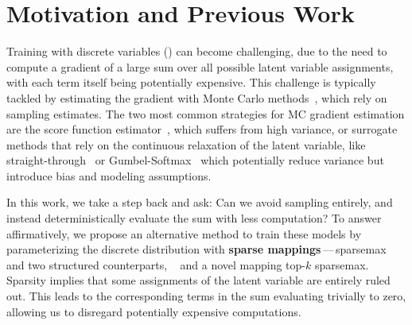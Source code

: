 \label{cap:sparsemarg}

\section{Motivation and Previous Work}
\label{sec:intro}

Training with discrete variables () can
become challenging, due to the need to compute a gradient of a large
sum over all possible latent variable assignments, with each term
itself being potentially expensive. This challenge is typically
tackled by estimating the gradient with Monte Carlo
methods~\citep[MC;][]{mohamed2019monte}, which rely on sampling
estimates. The two most common strategies for MC gradient estimation
are the score function
estimator~\citep[SFE;][]{rubinstein1976monte,paisley2012variational},
which suffers from high variance, or surrogate methods that rely on
the continuous relaxation of the latent variable, like
straight-through~\citep{STE} or
Gumbel-Softmax~\citep{Concrete,GumbelSoftmax} which potentially
reduce variance but introduce bias and modeling assumptions.

In this work, we take a step back and ask: Can we avoid sampling
entirely, and instead deterministically evaluate the sum with less
computation? To answer affirmatively, we propose an alternative
method to train these models by parameterizing the discrete
distribution with {\bf sparse
        mappings}\,---\,sparsemax~\citep{martins2016softmax} and two
structured counterparts, \smap~\citep{niculae2018sparsemap} and a
novel mapping top-$k$ sparsemax. Sparsity implies that some
assignments of the latent variable are entirely ruled out. This leads
to the corresponding terms in the sum evaluating trivially to zero,
allowing us to disregard potentially expensive computations.

